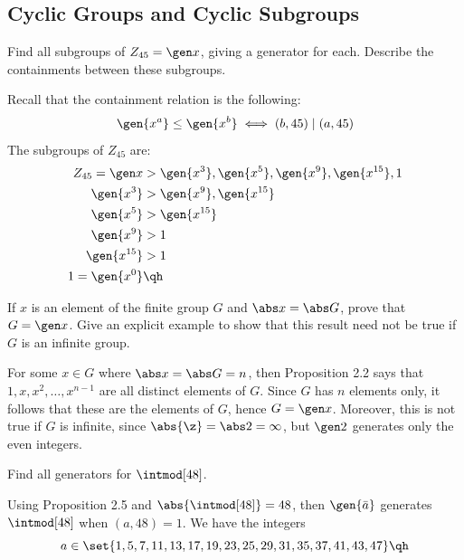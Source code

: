 \newpage

\subsection{Cyclic Groups and Cyclic Subgroups}

\begin{exercise} \label{ex2.3.1}
    Find all subgroups of $Z_{45} = \gen x$, giving a generator for each. Describe the containments between these subgroups.
\end{exercise}

\begin{sol}
    Recall that the containment relation is the following:
    \[\gen{x^a} \leq \gen{x^b} \iff (b, 45) \mid (a, 45)\]
    The subgroups of $Z_{45}$ are:
    \begin{align*}
        Z_{45} = \gen x & > \gen{x^3}, \gen{x^5}, \gen {x^9}, \gen{x^{15}}, 1 \\
        \gen{x^3} & > \gen{x^9}, \gen{x^{15}} \\
        \gen{x^5} & > \gen{x^{15}} \\
        \gen{x^9} & > 1 \\
        \gen{x^{15}} & > 1 \\
        1 = \gen{x^0} & \qh
    \end{align*}
\end{sol}

\begin{exercise} \label{ex2.3.2}
    If $x$ is an element of the finite group $G$ and $\abs x = \abs G$, prove that $G = \gen x$. Give an explicit example to show that this result need not be true if $G$ is an infinite group.
\end{exercise}

\begin{sol}
    For some $x \in G$ where $\abs x = \abs G = n$, then Proposition 2.2 says that $1, x, x^2, \ldots, x^{n - 1}$ are all distinct elements of $G$. Since $G$ has $n$ elements only, it follows that these are the elements of $G$, hence $G = \gen x$. Moreover, this is not true if $G$ is infinite, since $\abs{\z} = \abs 2 = \infty$, but $\gen 2$ generates only the even integers.
\end{sol}

\begin{exercise}\label{ex2.3.3}
    Find all generators for $\intmod[48]$.
\end{exercise}

\begin{sol}
    Using Proposition 2.5 and $\abs{\intmod[48]} = 48$, then $\gen{\bar a}$ generates $\intmod[48]$ when $(a, 48) = 1$. We have the integers
    \[a \in \set{1, 5, 7, 11, 13, 17, 19, 23, 25, 29, 31, 35, 37, 41, 43, 47} \qh\]
\end{sol}

